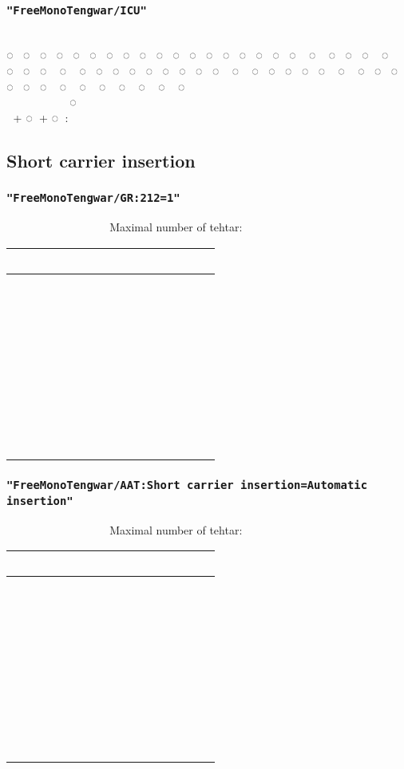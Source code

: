 \documentclass[11pt,a4paper]{article}
\begin{document}
\subsubsection*{\texttt{"FreeMonoTengwar/ICU"}}

\freeICU
                          \\
◌ ◌ ◌ ◌ ◌ ◌ ◌ ◌ ◌ ◌ ◌ ◌ ◌ ◌ ◌ ◌ ◌ ◌ ◌ ◌ ◌ ◌ ◌ ◌ ◌ ◌ ◌ ◌ ◌ ◌ ◌ ◌ ◌ ◌ ◌ ◌ ◌ ◌ ◌ ◌ ◌ ◌ ◌ ◌ ◌ ◌ ◌ ◌ ◌ ◌ ◌ ◌ ◌ ◌ ◌ ◌\\
      ◌‍ ‍ ‍ ‍ \\
 \normalfont + \freeICU ◌ \normalfont + \freeICU ◌ : 


\newpage

\subsection{Short carrier insertion}

\subsubsection*{\texttt{"FreeMonoTengwar/GR:212=1"}}

\insertGR      \normalfont Maximal number of tehtar:
\insertGR 

\newcommand{\combinationsrow}[1]{#1 & #1 & #1 & #1 & #1 & #1 & #1 & #1 & #1 \\}

\begin{tabular}{ c | c c c c c c c c}
	\combinationsrow{} \hline
	\combinationsrow{}
	\combinationsrow{}
	\combinationsrow{}
	\combinationsrow{}
	\combinationsrow{}
	\combinationsrow{}
	\combinationsrow{}
	\combinationsrow{}
\end{tabular}

\subsubsection*{\texttt{"FreeMonoTengwar/AAT:Short carrier insertion=Automatic insertion"}}

\insertAAT      \normalfont Maximal number of tehtar:
\insertAAT 

\begin{tabular}{ c | c c c c c c c c}
	\combinationsrow{} \hline
	\combinationsrow{}
	\combinationsrow{}
	\combinationsrow{}
	\combinationsrow{}
	\combinationsrow{}
	\combinationsrow{}
	\combinationsrow{}
	\combinationsrow{}
\end{tabular}
\end{document}
